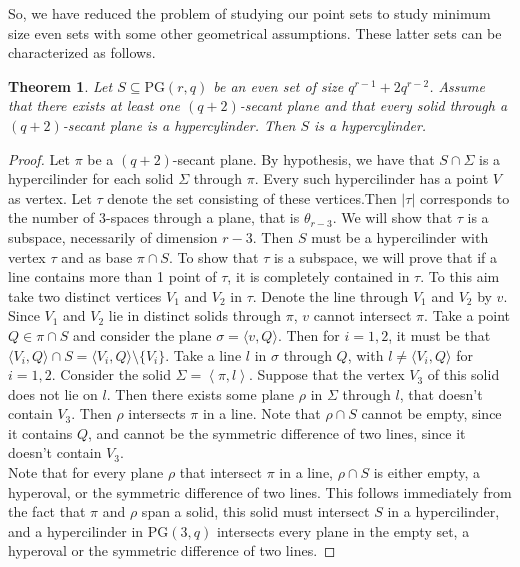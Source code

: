 \documentclass[11pt]{amsart}
\newtheorem{theorem}{Theorem}[section]
\newcommand{\PG}{\mathrm{PG}}
\newcommand{\vspan}[1]{\left \langle #1 \right \rangle}
\begin{document}
So, we have reduced the problem of studying our point sets to study minimum size even sets with some other geometrical assumptions. These latter sets can be characterized as follows.

\begin{theorem} \label{th:classificationsam}
Let $S \subseteq \PG(r,q)$ be an even set of size $q^{r-1}+2q^{r-2}$. Assume that there exists at least one $(q+2)$-secant plane and that every solid through a $(q+2)$-secant plane is a hypercylinder. Then $S$ is a hypercylinder.  
\end{theorem}
\begin{proof}
Let $\pi$ be a $(q+2)$-secant plane. By hypothesis, we have that $S \cap \Sigma$ is a hypercilinder for each solid $\Sigma$ through $\pi$.
Every such hypercilinder has a point $V$ as vertex.
Let $\tau$ denote the set consisting of these vertices.Then $|\tau|$ corresponds to the number of $3$-spaces through a plane, that is $\theta_{r-3}$.
We will show that $\tau$ is a subspace, necessarily of dimension $r-3$.
Then $S$ must be a hypercilinder with vertex $\tau$ and as base $\pi \cap S$.
To show that $\tau$ is a subspace, we will prove that if a line contains more than 1 point of $\tau$, it is completely contained in $\tau$.
To this aim take two distinct vertices $V_1$ and $V_2$ in $\tau$.
Denote the line through $V_1$ and $V_2$ by $v$.
Since $V_1$ and $V_2$ lie in distinct solids through $\pi$, $v$ cannot intersect $\pi$.
Take a point $Q \in \pi \cap S$ and consider the plane $\sigma = \langle v, Q\rangle $.
Then for $i=1,2$, it must be that $\langle V_i,Q \rangle \cap S = \langle V_i,Q \rangle \setminus \{V_i\}$.
Take a line $l$ in $\sigma$ through $Q$, with $l \neq \langle V_i,Q\rangle $ for $i=1,2$.
Consider the solid $\Sigma = \vspan{\pi,l}$.
Suppose that the vertex $V_3$ of this solid does not lie on $l$.
Then there exists some plane $\rho$ in $\Sigma$ through $l$, that doesn't contain $V_3$.
Then $\rho$ intersects $\pi$ in a line.
Note that $\rho \cap S$ cannot be empty, since it contains $Q$, and cannot be the symmetric difference of two lines, since it doesn't contain $V_3$.
\\
Note that for every plane $\rho$ that intersect $\pi$ in a line, $\rho \cap S$ is either empty, a hyperoval, or the symmetric difference of two lines.
This follows immediately from the fact that $\pi$ and $\rho$ span a solid, this solid must intersect $S$ in a hypercilinder, and a hypercilinder in $\PG(3,q)$ intersects every plane in the empty set, a hyperoval or the symmetric difference of two lines.

\end{proof}
\end{document}
